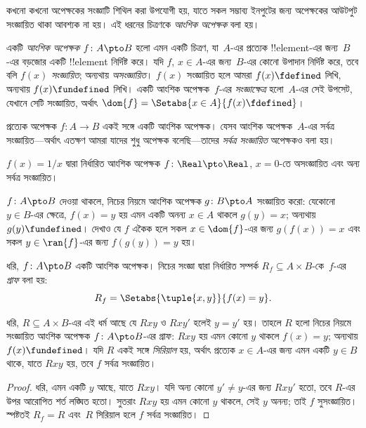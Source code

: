 \documentclass[../../../include/open-logic-section]{subfiles}
\begin{document}


\begin{explain}
কখনো কখনো অপেক্ষকের সংজ্ঞাটি শিথিল করা উপযোগী হয়, যাতে সকল সম্ভাব্য ইনপুটের জন্য অপেক্ষকের আউটপুট সংজ্ঞায়িত থাকা আবশ্যক না হয়। এই ধরনের চিত্রণকে \emph{আংশিক অপেক্ষক} বলা হয়।
\end{explain}

\begin{defn}
একটি \emph{আংশিক অপেক্ষক} $f \colon A \pto B$ হলো এমন একটি চিত্রণ, যা~$A$-এর প্রত্যেক !!{element}-এর জন্য~$B$-এর বড়জোর একটি !!{element} নির্দিষ্ট করে। যদি $f$, $x \in A$-এর জন্য~$B$-এর কোনো উপাদান নির্দিষ্ট করে, তবে বলি $f(x)$ \emph{সংজ্ঞায়িত}; অন্যথায় \emph{অসংজ্ঞায়িত}। $f(x)$ সংজ্ঞায়িত হলে আমরা $f(x) \fdefined$ লিখি, অন্যথায় $f(x) \fundefined$ লিখি। একটি আংশিক অপেক্ষক~$f$-এর \emph{সংজ্ঞাক্ষেত্র} হলো~$A$-এর সেই উপসেট, যেখানে সেটি সংজ্ঞায়িত, অর্থাৎ $\dom{f} = \Setabs{x \in A}{f(x) \fdefined}$।
\end{defn}

\begin{ex}
প্রত্যেক অপেক্ষক $f\colon A \to B$ একই সঙ্গে একটি আংশিক অপেক্ষক। যেসব আংশিক অপেক্ষক~$A$-এর সর্বত্র সংজ্ঞায়িত—অর্থাৎ এতক্ষণ আমরা যাদের শুধু অপেক্ষক বলেছি—তাদের \emph{সর্বত্র সংজ্ঞায়িত} অপেক্ষকও বলা হয়।
\end{ex}

\begin{ex}
$f(x) = 1/x$ দ্বারা নির্ধারিত আংশিক অপেক্ষক $f \colon \Real \pto \Real$, $x = 0$-তে অসংজ্ঞায়িত এবং অন্য সর্বত্র সংজ্ঞায়িত।
\end{ex}

\begin{prob}
$f\colon A \pto B$ দেওয়া থাকলে, নিচের নিয়মে আংশিক অপেক্ষক $g\colon B \pto
A$ সংজ্ঞায়িত করো: যেকোনো $y \in B$-এর ক্ষেত্রে, $f(x) = y$ হয় এমন একটি অনন্য $x \in A$ থাকলে $g(y) = x$; অন্যথায় $g(y) \fundefined$। দেখাও যে $f$ একৈক হলে সকল $x \in \dom{f}$-এর জন্য $g(f(x)) = x$ এবং সকল $y \in \ran{f}$-এর জন্য $f(g(y)) = y$ হয়।
\end{prob}

\begin{defn}[আংশিক অপেক্ষকের গ্রাফ]
ধরি, $f\colon A \pto B$ একটি আংশিক অপেক্ষক। নিচের সংজ্ঞা দ্বারা নির্ধারিত সম্পর্ক $R_f \subseteq A \times B$-কে~$f$-এর \emph{গ্রাফ} বলা হয়:
\[
R_f = \Setabs{\tuple{x,y}}{f(x) = y}.
\]
\end{defn}

\begin{prop}
ধরি, $R \subseteq A \times B$-এর এই ধর্ম আছে যে $Rxy$ ও $Rxy'$ হলেই $y = y'$ হয়। তাহলে $R$ হলো নিচের নিয়মে সংজ্ঞায়িত আংশিক অপেক্ষক $f\colon A \pto B$-এর গ্রাফ: $Rxy$ হয় এমন কোনো $y$ থাকলে $f(x) = y$; অন্যথায় $f(x) \fundefined$। যদি $R$ একই সঙ্গে \emph{সিরিয়াল} হয়, অর্থাৎ প্রত্যেক $x \in A$-এর জন্য এমন একটি $y \in B$ থাকে, যাতে $Rxy$ হয়, তবে $f$ সর্বত্র সংজ্ঞায়িত।
\end{prop}

\begin{proof}
ধরি, এমন একটি $y$ আছে, যাতে $Rxy$। যদি অন্য কোনো $y'
\neq y$-এর জন্য $Rxy'$ হতো, তবে $R$-এর উপর আরোপিত শর্ত লঙ্ঘিত হতো। সুতরাং $Rxy$ হয় এমন কোনো $y$ থাকলে, সেই $y$ অনন্য; তাই $f$ সুসংজ্ঞায়িত। স্পষ্টতই $R_f = R$ এবং~$R$ সিরিয়াল হলে $f$ সর্বত্র সংজ্ঞায়িত।
\end{proof}
\end{document}
